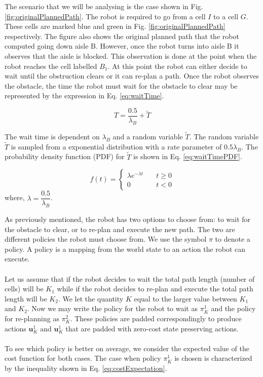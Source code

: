 \documentclass[a4paper,12pt]{article}
\begin{document}
			The scenario that we will be analysing is the case shown in Fig. \ref{fig:originalPlannedPath}. The robot is required to go from a cell $I$ to a cell $G$. These cells are marked blue and green in Fig. \ref{fig:originalPlannedPath} respectively. The figure also shows the original planned path that the robot computed going down aisle B. However, once the robot turns into aisle B it observes that the aisle is blocked. This observation is done at the point when the robot reaches the cell labelled $B_{1}$. At this point the robot can either decide to wait until the obstruction clears or it can re-plan a path. Once the robot observes the obstacle, the time the robot must wait for the obstacle to clear may be represented by the expression in Eq. \ref{eq:waitTime}. 

			\begin{equation}
				T=\frac{0.5}{\lambda_{B}}+\widetilde{T}
				\label{eq:waitTime}
			\end{equation}

			The wait time is dependent on $\lambda_{B}$ and a random variable $\widetilde{T}$. The random variable $\widetilde{T}$ is sampled from a exponential distribution with a rate parameter of $0.5\lambda_{B}$. The probability density function (PDF) for $\widetilde{T}$ is shown in Eq. \ref{eq:waitTimePDF}. 

			\begin{equation}
				f(t) = 
				\begin{cases}
				\lambda e^{-\lambda t} & \quad t \geq 0 \\
				0 & \quad t < 0
				\end{cases}
				\label{eq:waitTimePDF}
			\end{equation}
			where, $\lambda = \dfrac{0.5}{\lambda_{B}}$. 
			
			As previously mentioned, the robot has two options to choose from: to wait for the obstacle to clear, or to re-plan and execute the new path. The two are different policies the robot must choose from. We use the symbol $\pi$ to denote a policy. A policy is a mapping from the world state to an action the robot can execute.
			\\
			\\
			Let us assume that if the robot decides to wait the total path length (number of cells) will be $K_1$ while if the robot decides to re-plan and execute the total path length will be $K_2$. We let the quantity $K$ equal to the larger value between $K_1$ and $K_2$. Now we may write the policy for the robot to wait as $\pi_{K}^{1}$ and the policy for re-planning as $\pi_{K}^{2}$. These policies are padded correspondingly to produce actions $\textbf{u}_{K}^{1}$ and $\textbf{u}_{K}^{1}$ that are padded with zero-cost state preserving actions.
			\\
			\\
			To see which policy is better on average, we consider the expected value of the cost function for both cases. The case when policy $\pi_{K}^{1}$ is chosen is characterized by the inequality shown in Eq. \ref{eq:costExpectation}.
\end{document}
